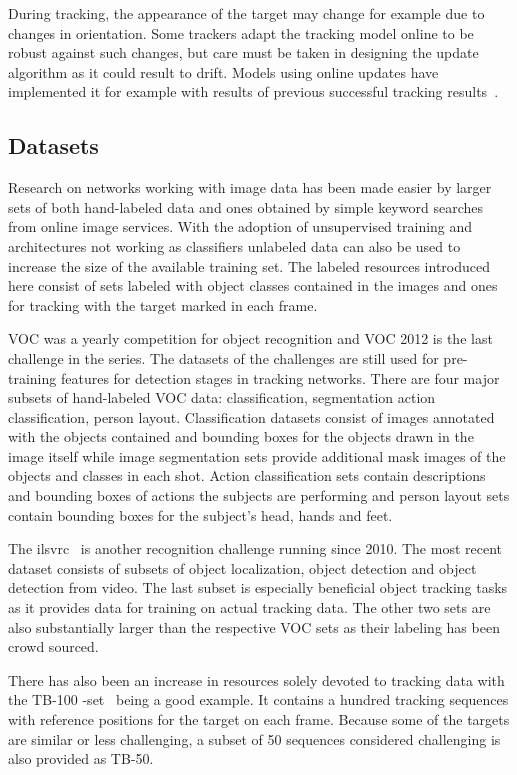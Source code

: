 During tracking, the appearance of the target may change for example due to changes in
orientation. Some trackers adapt the tracking model online to be robust against such
changes, but care must be taken in designing the update algorithm as it could result
to drift. Models using online updates have implemented it for example with results of
previous successful tracking results~\cite{BLUR_TRACK}.

\subsection{Datasets}
Research on networks working with image data has been made easier by larger sets of both
hand-labeled data and ones obtained by simple keyword searches from online image services.
With the adoption of unsupervised training and architectures not working as classifiers
unlabeled data can also be used to increase the size of the available training set.
The labeled resources introduced here consist of sets labeled with object classes contained
in the images and ones for tracking with the target marked in each frame.

VOC was a yearly competition for object recognition and VOC 2012 \cite{VOC12} is the last
challenge in the series. The datasets of the challenges are still used for pre-training
features for detection stages in tracking networks. There are four major subsets of
hand-labeled VOC data: classification, segmentation action classification, person layout.
Classification datasets consist of images annotated with the objects contained and bounding
boxes for the objects drawn in the image itself while image segmentation sets provide
additional mask images of the objects and classes in each shot. Action classification sets
contain descriptions and bounding boxes of actions the subjects are performing and person
layout sets contain bounding boxes for the subject's head, hands and feet.

The \ac{ilsvrc}~\cite{ILSVRC15} is another recognition challenge running since 2010. The
most recent dataset consists of subsets of object localization, object detection and
object detection from video. The last subset is especially beneficial object tracking
tasks as it provides data for training on actual tracking data. The other two sets are also
substantially larger than the respective VOC sets as their labeling has been crowd sourced.

There has also been an increase in resources solely devoted to tracking data with the
TB-100 -set~\cite{VTB} being a good example. It contains a hundred tracking sequences
with reference positions for the target on each frame. Because some of the targets are
similar or less challenging, a subset of 50 sequences considered challenging is also
provided as TB-50.~\cite{OT_BENCH}

